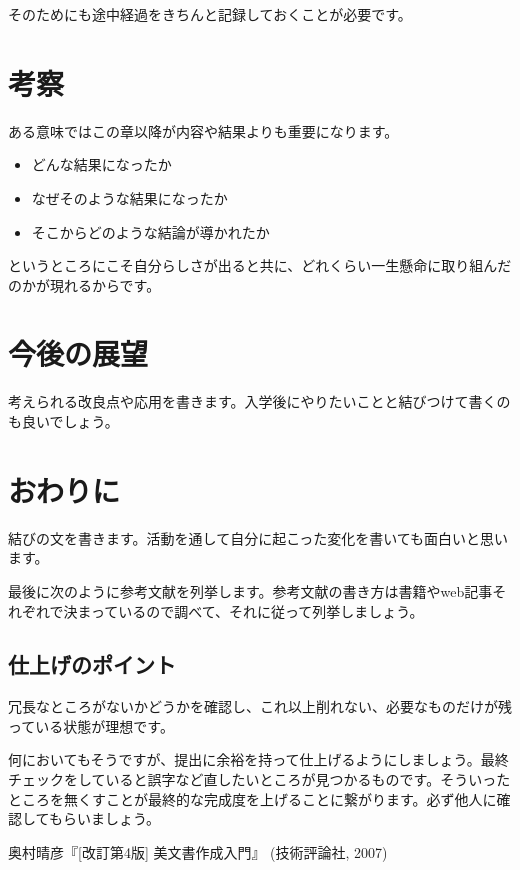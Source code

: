\documentclass[dvipdfmx, a4paper]{jsarticle}
\begin{document}
そのためにも途中経過をきちんと記録しておくことが必要です。

\section{考察}
ある意味ではこの章以降が内容や結果よりも重要になります。
\begin{itemize}
    \item どんな結果になったか
    \item なぜそのような結果になったか
    \item そこからどのような結論が導かれたか
\end{itemize}
というところにこそ自分らしさが出ると共に、どれくらい一生懸命に取り組んだのかが現れるからです。

\section{今後の展望}
考えられる改良点や応用を書きます。入学後にやりたいことと結びつけて書くのも良いでしょう。

\section{おわりに}
結びの文を書きます。活動を通して自分に起こった変化を書いても面白いと思います。

最後に次のように参考文献を列挙します。参考文献の書き方は書籍やweb記事それぞれで決まっているので調べて、それに従って列挙しましょう。

\subsection{仕上げのポイント}
冗長なところがないかどうかを確認し、これ以上削れない、必要なものだけが残っている状態が理想です。

何においてもそうですが、提出に余裕を持って仕上げるようにしましょう。最終チェックをしていると誤字など直したいところが見つかるものです。そういったところを無くすことが最終的な完成度を上げることに繋がります。必ず他人に確認してもらいましょう。

\begin{thebibliography}{9}
\item
奥村晴彦『[改訂第4版] \LaTeXe 美文書作成入門』
(技術評論社, 2007)
\end{thebibliography}
\end{document}
